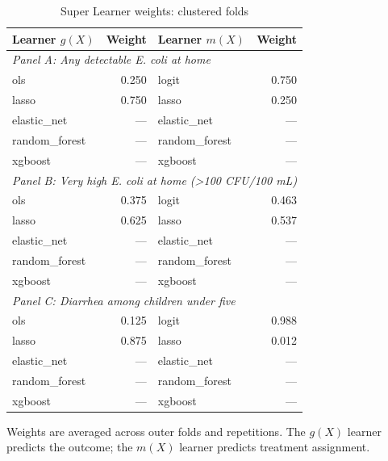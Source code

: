 \begin{table}[htbp]
\centering
\caption{Super Learner weights: clustered folds}
\label{tab:super-learner-weights-clustered}
\small
\begin{tabular}{lrlr}
\toprule
Learner $g(X)$ & Weight & Learner $m(X)$ & Weight \\
\midrule
\multicolumn{4}{l}{\textit{Panel A: Any detectable E. coli at home}} \\
ols & 0.250 & logit & 0.750 \\
lasso & 0.750 & lasso & 0.250 \\
elastic\_net & --- & elastic\_net & --- \\
random\_forest & --- & random\_forest & --- \\
xgboost & --- & xgboost & --- \\
\midrule
\multicolumn{4}{l}{\textit{Panel B: Very high E. coli at home (>100 CFU/100 mL)}} \\
ols & 0.375 & logit & 0.463 \\
lasso & 0.625 & lasso & 0.537 \\
elastic\_net & --- & elastic\_net & --- \\
random\_forest & --- & random\_forest & --- \\
xgboost & --- & xgboost & --- \\
\midrule
\multicolumn{4}{l}{\textit{Panel C: Diarrhea among children under five}} \\
ols & 0.125 & logit & 0.988 \\
lasso & 0.875 & lasso & 0.012 \\
elastic\_net & --- & elastic\_net & --- \\
random\_forest & --- & random\_forest & --- \\
xgboost & --- & xgboost & --- \\
\bottomrule
\end{tabular}
\par\vspace{3pt}
\begin{minipage}{0.9\linewidth}\footnotesize Weights are averaged across outer folds and repetitions. The $g(X)$ learner predicts the outcome; the $m(X)$ learner predicts treatment assignment.\end{minipage}
\end{table}